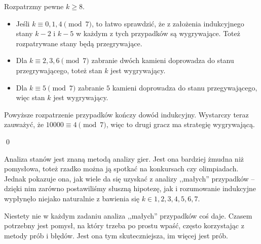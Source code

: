 \vspace{10px}
\noindent
Rozpatrzmy pewne $k \geqslant 8$.
\begin{itemize}
	\item Jeśli $k \equiv 0, 1, 4 \pmod{7}$, to łatwo sprawdzić, że z założenia indukcyjnego stany $k - 2$ i $k - 5$ w każdym z tych przypadków są wygrywające. Toteż rozpatrywane stany będą przegrywające.
	\item Dla $k \equiv 2, 3, 6 \pmod{7}$ zabranie dwóch kamieni doprowadza do stanu przegrywającego, toteż stan $k$ jest wygrywający.
	\item Dla $k \equiv 5 \pmod{7}$ zabranie $5$ kamieni doprowadza do stanu przegywającego, więc stan $k$ jest wygrywający. 
\end{itemize}
Powyższe rozpatrzenie przypadków kończy dowód indukcyjny.
Wystarczy teraz zauważyć, że $10000 \equiv 4 \pmod{7}$, więc to drugi gracz ma strategię wygrywającą.

\qed

\noindent
Analiza stanów jest znaną metodą analizy gier. Jest ona bardziej żmudna niż pomysłowa, toteż rzadko można ją spotkać na konkursach czy olimpiadach. Jednak pokazuje ona, jak wiele da się uzyskać z analizy ,,małych'' przypadków -- dzięki nim zarówno postawiliśmy słuszną hipotezę, jak i rozumowanie indukcyjne wypłynęło niejako naturalnie z bawienia się $k \in {1, 2, 3, 4, 5, 6, 7}$.


\vspace{10px}
\noindent
Niestety nie w każdym zadaniu analiza ,,małych'' przypadków coś daje. Czasem potrzebny jest pomysł, na który trzeba po prostu wpaść, często korzystając z metody prób i błędów. Jest ona tym skuteczniejsza, im więcej jest prób.

